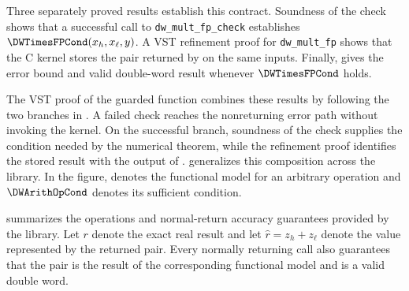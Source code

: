 Three separately proved results establish this contract.  Soundness of the
check shows that a successful call to \texttt{dw\_mult\_fp\_check} establishes
$\DWTimesFPCond(x_h,x_\ell,y)$.  A VST refinement proof for
\texttt{dw\_mult\_fp} shows that the C kernel stores the pair returned by
\DWTimesFP{} on the same inputs.  Finally,
 gives the error bound and valid double-word
result whenever $\DWTimesFPCond$ holds.

The VST proof of the guarded function combines these results by following the
two branches in .  A failed check reaches the
nonreturning error path without invoking the kernel.  On the successful
branch, soundness of the check supplies the condition needed by the numerical
theorem, while the refinement proof identifies the stored result with the output
of \DWTimesFP{}.   generalizes this composition
across the library.  In the figure, \DWArithOp{} denotes the functional model
for an arbitrary operation and $\DWArithOpCond$ denotes its sufficient
condition.

 summarizes the operations and normal-return
accuracy guarantees provided by the library.  Let $r$ denote the exact real
result and let $\widehat r=z_h+z_\ell$ denote the value represented by the
returned pair.  Every normally returning call also guarantees that the pair
is the result of the corresponding functional model and is a valid double
word.

